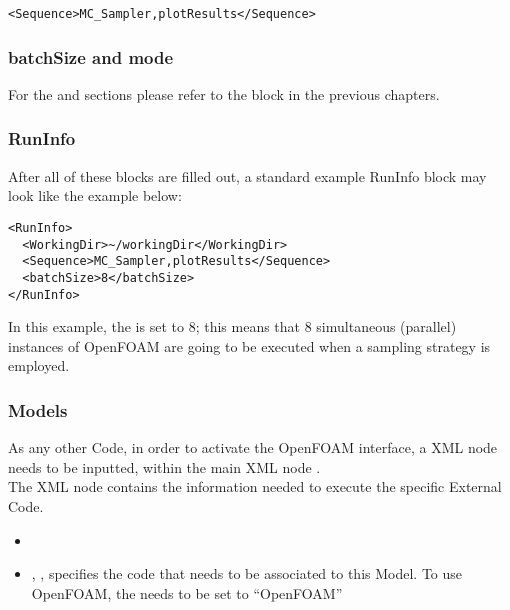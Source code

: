 \begin{lstlisting}[style=XML]
<Sequence>MC_Sampler,plotResults</Sequence>
\end{lstlisting}

\subsubsection{batchSize and mode}
For the  and  sections please refer to the
 block in the previous chapters.

\subsubsection{RunInfo}
After all of these blocks are filled out, a standard example RunInfo block may
look like the example below: \\

\begin{lstlisting}[style=XML]
<RunInfo>
  <WorkingDir>~/workingDir</WorkingDir>
  <Sequence>MC_Sampler,plotResults</Sequence>
  <batchSize>8</batchSize>
</RunInfo>
\end{lstlisting}
In this example, the  is set to $8$; this means that 8 simultaneous (parallel) instances
of OpenFOAM are going to be executed when a sampling strategy is employed.

\subsubsection{Models}
\label{subsub:OpenFOAMModels}
As any other Code, in order to activate the OpenFOAM interface, a  XML node needs to be inputted, within the
main XML node .
\\The  {} XML node contains the
information needed to execute the specific External Code.

\attrsIntro
%

\begin{itemize}
  \itemsep0em
  \item \nameDescription
  \item {}, , specifies the
  code that needs to be associated to this Model. To use OpenFOAM, the  needs to be set to ``OpenFOAM'' 
\end{itemize}


